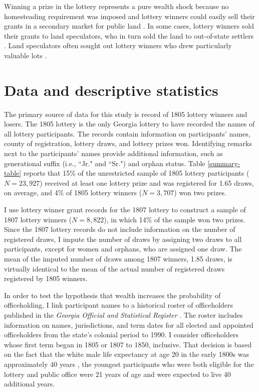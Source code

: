 Winning a prize in the lottery represents a pure wealth shock because no homesteading requirement was imposed and lottery winners could easily sell their grants in a secondary market for public land \citep{weiman1991}. In some cases, lottery winners sold their grants to land speculators, who in turn sold the land to out-of-state settlers \citep{davis1981}. Land speculators often sought out lottery winners who drew particularly valuable lots \citep{cadle1991}.

\section{Data and descriptive statistics} \label{data}

The primary source of data for this study is  record of 1805 lottery winners and losers. The 1805 lottery is the only Georgia lottery to have recorded the names of all lottery participants. The records contain information on participants' names, county of registration, lottery draws, and lottery prizes won. Identifying remarks next to the participants' names provide additional information, such as generational suffix (i.e., ``Jr." and ``Sr.") and orphan status. Table \ref{summary-table} reports that 15\% of the unrestricted sample of 1805 lottery participants ($N=23,927$) received at least one lottery prize and was registered for 1.65 draws, on average, and 4\% of 1805 lottery winners ($N=3,707$) won two prizes.

I use lottery winner grant records for the 1807 lottery \citep{graham2011} to construct a sample of 1807 lottery winners ($N = 8,822$), in which 14\% of the sample won two prizes. Since the 1807 lottery records do not include information on the number of registered draws, I impute the number of draws by assigning two draws to all participants, except for women and orphans, who are assigned one draw. The mean of the imputed number of draws among 1807 winners, 1.85 draws, is virtually identical to the mean of the actual number of registered draws registered by 1805 winners.

In order to test the hypothesis that wealth increases the probability of officeholding, I link participant names to a historical roster of officeholders published in the \textit{Georgia Official and Statistical Register} \citep{archives1978, archives1990}. The roster includes information on names, jurisdictions, and term dates for all elected and appointed officeholders from the state's colonial period to 1990. I consider officeholders whose first term began in 1805 or 1807 to 1850, inclusive. That decision is based on the fact that the white male life expectancy at age 20 in the early 1800s was approximately 40 years \citep{hacker2010}, the youngest participants who were both eligible for the lottery and public office were 21 years of age and were expected to live 40 additional years. 

